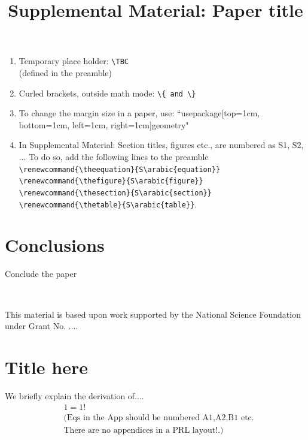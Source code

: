 \documentclass[pre,aps,reprint,noshowpacs,superscriptaddress,floatfix,letterpaper,longbibliography]{revtex4-2}
\makeatletter
\newcommand{\TBC}{\magenta{[TBC]}}
\newcommand{\magenta}{\textcolor{magenta}}
\def\maketitle{
\@author@finish
\title@column\titleblock@produce
\suppressfloats[t]}
\makeatother
\begin{document}
\begin{enumerate}
\item Temporary place holder: \verb|\TBC| \\ (defined in the preamble)

\item Curled brackets, outside math mode: \verb|\{ and \} |

\item To change the margin size in a paper, use: ``usepackage[top=1cm, bottom=1cm, left=1cm, right=1cm]{geometry}"  

\item In Supplemental Material: Section titles, figures etc., are numbered as S1, S2, ... To do so, add the following lines to the preamble 
\verb|\renewcommand{\theequation}{S\arabic{equation}}|
\verb|\renewcommand{\thefigure}{S\arabic{figure}}|
\verb|\renewcommand{\thesection}{S\arabic{section}}|
\verb|\renewcommand{\thetable}{S\arabic{table}}|. 

\label{List:Latex}
\end{enumerate}

\lipsum[2-2]

\section{Conclusions}

Conclude the paper

\lipsum[2-3]
\\ 

\begin{acknowledgments}
This material is based upon work supported by the National Science Foundation under Grant No. ....

\end{acknowledgments}

 

\appendix

\section{Title here}
\label{AppAT} 
We briefly explain the derivation of.... 
\begin{align}
    &1=1!\nonumber\\ 
    &(\text{Eqs in the App should be numbered A1,A2,B1 etc.}\nonumber\\ 
    &\text{There are no appendices in a PRL layout!.)}
\end{align}



\clearpage
\setcounter{figure}{0}
\setcounter{section}{0}
\renewcommand{\thefigure}{SM\arabic{figure}}
\title{Supplemental Material: Paper title }
\maketitle

\end{document}
